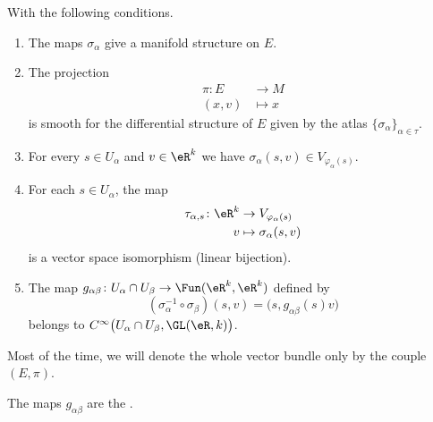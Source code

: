 \begin{definition}
	With the following conditions.
	\begin{enumerate}[label=(\alph*)]
		\item	\label{ITEMooVIYBooMXFaKb}
		      The maps \( \sigma_{\alpha}\) give a manifold structure on \( E\).
		\item	\label{ITEMooXHOBooERubro}
		      The projection
		      \begin{equation}
			      \begin{aligned}
				      \pi\colon E & \to M     \\
				      (x,v)       & \mapsto x
			      \end{aligned}
		      \end{equation}
		      is smooth for the differential structure of \( E\) given by the atlas \( \{ \sigma_{\alpha} \}_{\alpha\in\tau}\).
		\item		\label{ITEMooXJIVooVJTorK}
		      For every \( s\in U_{\alpha}\) and \( v\in \eR^k\) we have \( \sigma_{\alpha}(s,v)\in V_{\varphi_{\alpha}(s)}\).
		\item \label{ITEMooOBCMooOCqoQo}
		      For each \( s\in U_{\alpha}\), the map
		      \begin{equation}
			      \begin{aligned}
				      \tau_{\alpha,s}\colon \eR^k & \to V_{\varphi_{\alpha}(s)}  \\
				      v                           & \mapsto \sigma_{\alpha}(s,v)
			      \end{aligned}
		      \end{equation}
		      is a vector space isomorphism (linear bijection).
		\item		\label{ITEMooPNLXooLQWGqc}
		      The map \(g_{\alpha\beta} \colon U_{\alpha}\cap U_{\beta}\to \Fun(\eR^k,\eR^k)  \) defined by
		      \begin{equation}
			      (\sigma_{\alpha}^{-1}\circ \sigma_{\beta})(s,v)=\big( s,g_{\alpha\beta}(s)v \big)
		      \end{equation}
		      belongs to \( C^{\infty}\big( U_{\alpha}\cap U_{\beta},\GL(\eR,k) \big)\).
	\end{enumerate}
	Most of the time, we will denote the whole vector bundle only by the couple \( (E,\pi)\).

	The maps \( g_{\alpha\beta}\) are the .
\end{definition}


